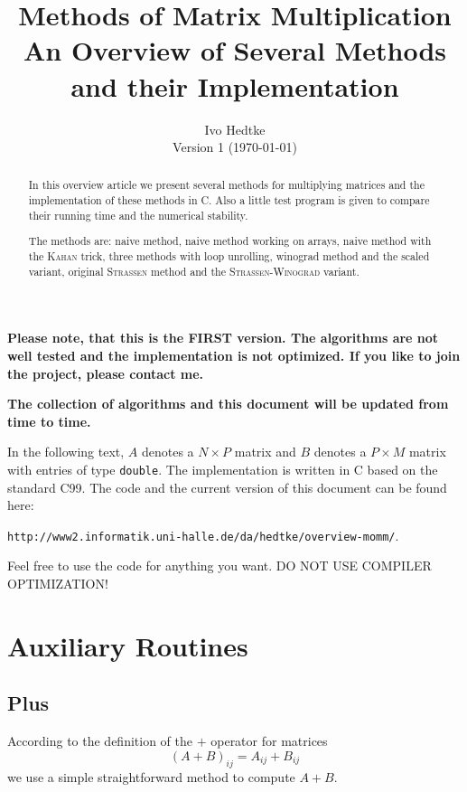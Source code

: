 \documentclass{amsart}
\newcommand{\CODE}[2]{}
\begin{document}
\title[Methods of Matrix Multiplication]{Methods of Matrix Multiplication\\[1ex]\normalfont An Overview of Several Methods and their Implementation}
\author[Ivo Hedtke]{Ivo Hedtke\\Version 1 (\today{})}
\address{Ivo Hedtke, Research Group: Data Structures and Efficient Algorithms, Institute for Computer Science, Martin-Luther-Universit\"at Halle-Wittenberg, Von-Seckendorff-Platz 1, 06120 Halle, Germany}

\begin{abstract}
In this overview article we present several methods for multiplying matrices and the implementation of these methods in C. Also a little test program is given to compare their running time and the numerical stability.

The methods are: naive method, naive method working on arrays, naive method with the \textsc{Kahan} trick, three methods with loop unrolling, winograd method and the scaled variant, original \textsc{Strassen} method and the \textsc{Strassen}-\textsc{Winograd} variant.
\end{abstract}
\maketitle

\textbf{Please note, that this is the FIRST version. The algorithms are not well tested and the implementation is not optimized. If you like to join the project, please contact me.}

\textbf{The collection of algorithms and this document will be updated from time to time.}

\tableofcontents

In the following text, $A$ denotes a $N\times P$ matrix and $B$ denotes a $P\times M$ matrix with entries of type \texttt{double}. The implementation is written in C based on the standard C99. The code and the current version of this document can be found here:

\texttt{http://www2.informatik.uni-halle.de/da/hedtke/overview-momm/}.

Feel free to use the code for anything you want. DO NOT USE COMPILER OPTIMIZATION!

\newpage\section{Auxiliary Routines}
\subsection{Plus} According to the definition of the $+$ operator for matrices
\[
(A+B)_{ij} = A_{ij} + B_{ij}
\]
we use a simple straightforward method to compute $A+B$.
\CODE{Plus.c}{3}
\end{document}
